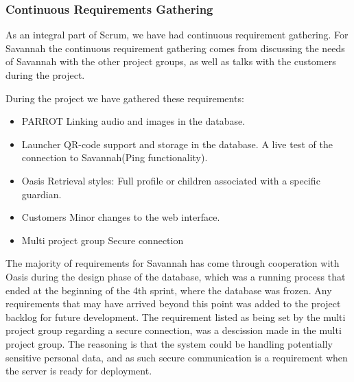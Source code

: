 
\subsubsection*{Continuous Requirements Gathering}
As an integral part of Scrum, we have had continuous requirement gathering.
For Savannah the continuous requirement gathering comes from discussing the needs of Savannah with the other project groups, as well as talks with the customers
during the project.

During the project we have gathered these requirements:
\begin{itemize}
 \item PARROT
  \subitem Linking audio and images in the database.
 \item Launcher
  \subitem QR-code support and storage in the database.
  \subitem A live test of the connection to Savannah(Ping functionality).
 \item Oasis
  \subitem Retrieval styles: Full profile or children associated with a specific guardian.
 \item Customers
  \subitem Minor changes to the web interface.
 \item Multi project group
  \subitem Secure connection
\end{itemize}

The majority of requirements for Savannah has come through cooperation with Oasis during the design phase of the database, which was a running process that ended
at the beginning of the 4th sprint, where the database was frozen. Any requirements that may have arrived beyond this point was added to the project backlog for future development.
The requirement listed as being set by the multi project group regarding a secure connection, was a descission made in the multi project group. The reasoning is that the system could be 
handling potentially sensitive personal data, and as such secure communication is a requirement when the server is ready for deployment.